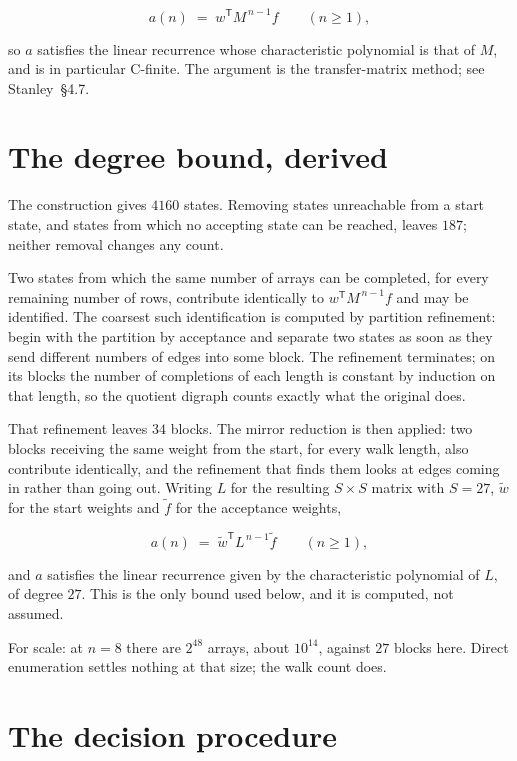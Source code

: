 \documentclass[11pt]{article}
\theoremstyle{definition}
\begin{document}
\[a(n) \;=\; w^{\mathsf T} M^{\,n-1} f \qquad (n \ge 1),\]

so $a$ satisfies the linear recurrence whose characteristic polynomial is that of $M$, and is in particular C-finite. The argument is the transfer-matrix method; see Stanley~\S4.7.

\section{The degree bound, derived}

The construction gives $4160$ states. Removing states unreachable from a start state, and states from which no accepting state can be reached, leaves $187$; neither removal changes any count.

Two states from which the same number of arrays can be completed, for every remaining number of rows, contribute identically to $w^{\mathsf T}M^{\,n-1}f$ and may be identified. The coarsest such identification is computed by partition refinement: begin with the partition by acceptance and separate two states as soon as they send different numbers of edges into some block. The refinement terminates; on its blocks the number of completions of each length is constant by induction on that length, so the quotient digraph counts exactly what the original does.

That refinement leaves $34$ blocks. The mirror reduction is then applied: two blocks receiving the same weight from the start, for every walk length, also contribute identically, and the refinement that finds them looks at edges coming in rather than going out. Writing $L$ for the resulting $S \times S$ matrix with $S = 27$, $\tilde w$ for the start weights and $\tilde f$ for the acceptance weights,

\[a(n) \;=\; \tilde w^{\mathsf T} L^{\,n-1} \tilde f \qquad (n \ge 1),\]

and $a$ satisfies the linear recurrence given by the characteristic polynomial of $L$, of degree $27$. This is the only bound used below, and it is computed, not assumed.

For scale: at $n = 8$ there are $2^{48}$ arrays, about $10^{14}$, against $27$ blocks here. Direct enumeration settles nothing at that size; the walk count does.

\section{The decision procedure}
\end{document}
